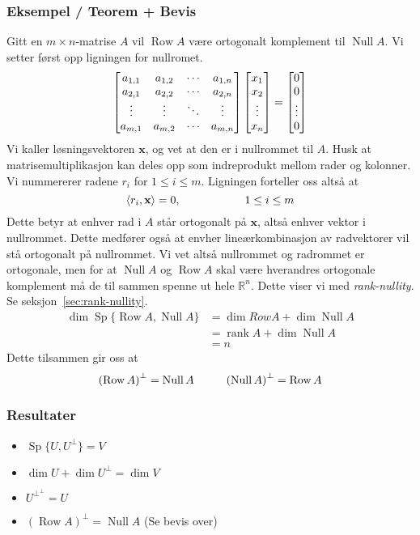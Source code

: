\documentclass[12pt,a4paper,norsk]{article}
\makeatletter
\newcommand{\R}{\mathbb{R}}
\newcommand{\mat}[2]{\left[\begin{array}{@{}#1@{}}#2\end{array}\right]}
\newcommand{\inner}[1]{\langle#1\rangle}
\DeclareMathOperator{\Sp}{Sp} %
\DeclareMathOperator{\Row}{Row}
\DeclareMathOperator{\Null}{Null}
\DeclareMathOperator{\rank}{rank}
\newcommand{\vx}{\textbf{x}}
\makeatother
\begin{document}
\subsubsection{Eksempel / Teorem + Bevis}
Gitt en $m \times n$-matrise $A$ vil $\Row A$ være ortogonalt komplement til
$\Null A$. Vi setter først opp ligningen for nullromet.
\begin{align*}
  \mat{cccc}{a_{1,1} & a_{1,2} & \cdots & a_{1,n} \\ a_{2,1} & a_{2,2} & \cdots & a_{2,n} \\ \vdots & \vdots & \ddots & \vdots \\ a_{m,1} & a_{m,2} & \cdots & a_{m,n}}\mat{c}{x_{1} \\ x_{2} \\ \vdots \\ x_{n}} = \mat{c}{0 \\ 0 \\ \vdots \\ 0}
\end{align*}
Vi kaller løsningsvektoren $\vx$, og vet at den er i nullrommet til $A$.
Husk at matrisemultiplikasjon kan deles opp som indreprodukt mellom rader og
kolonner. Vi nummererer radene $r_{i}$ for $1 \le i \le m$. Ligningen forteller oss
altså at
\[\inner{r_{i}, \vx} = 0, \hspace{20mm} 1 \le i \le m\]
Dette betyr at enhver rad i $A$ står ortogonalt på $\vx$, altså enhver vektor i
nullrommet. Dette medfører også at envher lineærkombinasjon av radvektorer vil
stå ortogonalt på nullrommet. Vi vet altså nullrommet og radrommet er
ortogonale, men for at $\Null A$ og $\Row A$ skal være hverandres
ortogonale komplement må de til sammen spenne ut hele $\R^{n}$. Dette viser vi
med \textit{rank-nullity}. Se seksjon~\ref{sec:rank-nullity}.
\begin{align*}
  \dim \Sp\{\Row A, \Null A\} &= \dim Row A + \dim \Null A \\
                              &= \rank A + \dim \Null A \\
                              &= n
\end{align*}
Dette tilsammen gir oss at
\[{(\Row A)}^{\bot} = \Null A \hspace{10mm} {(\Null A)}^{\bot} = \Row A\]

\subsubsection{Resultater}
\begin{itemize}
  \item $\Sp\{U, U^{\perp}\} = V$
  \item $\dim U + \dim U^{\bot} = \dim V$
  \item $U^{\bot^\bot} = U$
  \item ${(\Row A)}^{\bot} = \Null A$ (Se bevis over)
\end{itemize}
\end{document}
